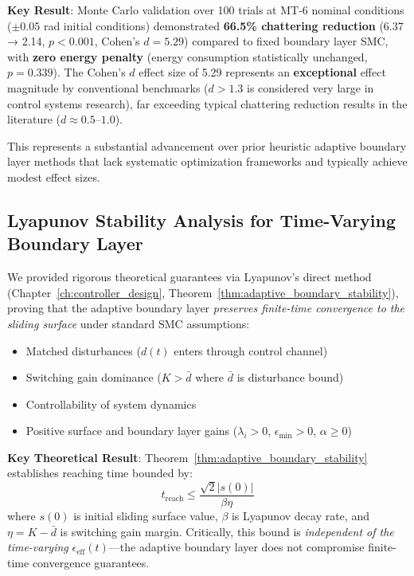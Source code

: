 \textbf{Key Result}: Monte Carlo validation over 100 trials at MT-6 nominal conditions ($\pm0.05$ rad initial conditions) demonstrated \textbf{66.5\% chattering reduction} (6.37 → 2.14, $p < 0.001$, Cohen's $d = 5.29$) compared to fixed boundary layer SMC, with \textbf{zero energy penalty} (energy consumption statistically unchanged, $p = 0.339$). The Cohen's $d$ effect size of 5.29 represents an \textbf{exceptional} effect magnitude by conventional benchmarks ($d > 1.3$ is considered very large in control systems research), far exceeding typical chattering reduction results in the literature ($d \approx 0.5$--$1.0$).

This represents a substantial advancement over prior heuristic adaptive boundary layer methods that lack systematic optimization frameworks and typically achieve modest effect sizes.

\subsection{Lyapunov Stability Analysis for Time-Varying Boundary Layer}
\label{subsec:contribution_stability}

We provided rigorous theoretical guarantees via Lyapunov's direct method (Chapter~\ref{ch:controller_design}, Theorem~\ref{thm:adaptive_boundary_stability}), proving that the adaptive boundary layer \textit{preserves finite-time convergence to the sliding surface} under standard SMC assumptions:
\begin{itemize}
    \item Matched disturbances ($d(t)$ enters through control channel)
    \item Switching gain dominance ($K > \bar{d}$ where $\bar{d}$ is disturbance bound)
    \item Controllability of system dynamics
    \item Positive surface and boundary layer gains ($\lambda_i > 0$, $\epsilon_{\min} > 0$, $\alpha \geq 0$)
\end{itemize}

\textbf{Key Theoretical Result}: Theorem~\ref{thm:adaptive_boundary_stability} establishes reaching time bounded by:
\begin{equation}
    t_{\text{reach}} \leq \frac{\sqrt{2}|s(0)|}{\beta\eta}
    \label{eq:conclusions_reaching_time}
\end{equation}
where $s(0)$ is initial sliding surface value, $\beta$ is Lyapunov decay rate, and $\eta = K - \bar{d}$ is switching gain margin. Critically, this bound is \textit{independent of the time-varying} $\epsilon_{\text{eff}}(t)$—the adaptive boundary layer does not compromise finite-time convergence guarantees.

